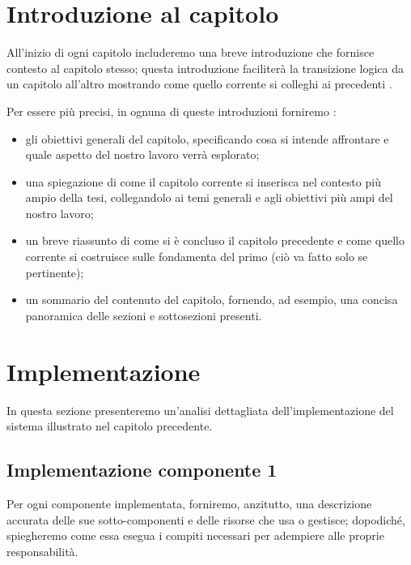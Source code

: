 \section{Introduzione al capitolo}

All'inizio di ogni capitolo includeremo una breve introduzione che fornisce contesto al capitolo stesso; questa introduzione faciliterà la transizione logica da un capitolo all'altro mostrando come quello corrente si colleghi ai precedenti \cite{zobel2015writing}.

\medskip

Per essere più precisi, in ognuna di queste introduzioni forniremo \cite{unibz2022thesis}:
\begin{itemize}

\item gli obiettivi generali del capitolo, specificando cosa si intende affrontare e quale aspetto del nostro lavoro verrà esplorato;

\item una spiegazione di come il capitolo corrente si inserisca nel contesto più ampio della tesi, collegandolo ai temi generali e agli obiettivi più ampi del nostro lavoro;

\item un breve riassunto di come si è concluso il capitolo precedente e come quello corrente si costruisce sulle fondamenta del primo (ciò va fatto solo se pertinente);

\item un sommario del contenuto del capitolo, fornendo, ad esempio, una concisa panoramica delle sezioni e sottosezioni presenti.

\end{itemize}

\section{Implementazione}

In questa sezione presenteremo un'analisi dettagliata dell'implementazione del sistema illustrato nel capitolo precedente.

\subsection{Implementazione componente 1}

Per ogni componente implementata, forniremo, anzitutto, una descrizione accurata delle sue sotto-componenti e delle risorse che usa o gestisce; dopodiché, spiegheremo come essa esegua i compiti necessari per adempiere alle proprie responsabilità.

